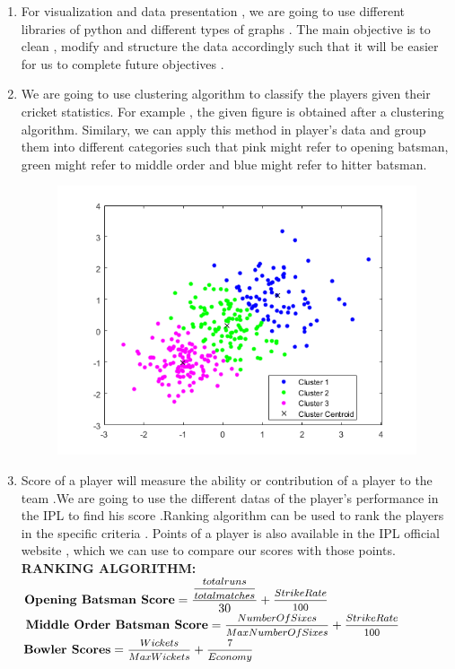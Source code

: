 \documentclass[12pt]{article}
\begin{document}
\begin{enumerate}
	\itemsep -0.1em 
	\item  For visualization and data presentation , we are going to use different libraries of python and different types of graphs . The main objective is to clean , modify and structure the data accordingly such that it will be easier for us to complete future objectives .
	\item We are going to use clustering algorithm to classify the players given their cricket statistics. For example , the given figure is obtained after a clustering algorithm. Similary, we can apply this method in player's data and group them into different categories such that pink might refer to opening batsman, green might refer to middle order and blue might refer to hitter batsman.
	
	\begin{figure}[h]
		\centering
		\includegraphics[scale=0.45]{cluster.png}
	\end{figure}
	
	\item Score of a player will measure the ability or contribution of a player to the team .We are going to use the different datas of the player's performance in the IPL to find his score .Ranking algorithm can be used to rank the players in the specific criteria . Points of a player is also available in the IPL official website , which we can use to compare our scores with those points.\\
	\textbf{RANKING ALGORITHM:}\\
	$\textbf{Opening Batsman Score} =  \dfrac{\mfrac{total runs}{total matches}}{30} + \mfrac{Strike Rate}{100}$\\
	$\textbf{Middle Order Batsman Score} =  \mfrac{Number Of Sixes}{Max Number Of Sixes} + \mfrac{Strike Rate}{100}$\\
	$\textbf{Bowler Scores} =  \mfrac{Wickets}{Max Wickets} + \mfrac{7}{Economy}$\\
	

\end{enumerate}
\end{document}
